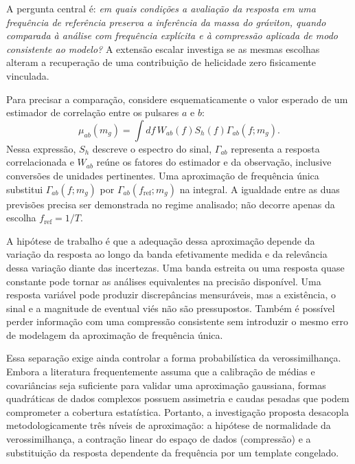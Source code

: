 A pergunta central é: \emph{em quais condições a avaliação da resposta
em uma frequência de referência preserva a inferência da massa do
gráviton, quando comparada à análise com frequência explícita e à
compressão aplicada de modo consistente ao modelo?} A extensão escalar
investiga se as mesmas escolhas alteram a recuperação de uma
contribuição de helicidade zero fisicamente vinculada.

Para precisar a comparação, considere esquematicamente o valor esperado
de um estimador de correlação entre os pulsares \(a\) e \(b\):
\begin{equation}
  \mu_{ab}(m_g)=\int df\,W_{ab}(f)S_h(f)
  \Gamma_{ab}(f;m_g).
  \label{eq:intro-compressao}
\end{equation}
Nessa expressão, \(S_h\) descreve o espectro do sinal,
\(\Gamma_{ab}\) representa a resposta correlacionada e \(W_{ab}\)
reúne os fatores do estimador e da observação, inclusive conversões de
unidades pertinentes. Uma aproximação de frequência única substitui
\(\Gamma_{ab}(f;m_g)\) por
\(\Gamma_{ab}(f_{\mathrm{ref}};m_g)\) na integral. A igualdade entre
as duas previsões precisa ser demonstrada no regime analisado; não
decorre apenas da escolha \(f_{\mathrm{ref}}=1/T\).

A hipótese de trabalho é que a adequação dessa aproximação depende da
variação da resposta ao longo da banda efetivamente medida e da
relevância dessa variação diante das incertezas. Uma banda estreita ou
uma resposta quase constante pode tornar as análises equivalentes na
precisão disponível. Uma resposta variável pode produzir discrepâncias
mensuráveis, mas a existência, o sinal e a magnitude de eventual viés
não são pressupostos. Também é possível perder informação com uma
compressão consistente sem introduzir o mesmo erro de modelagem da
aproximação de frequência única.

Essa separação exige ainda controlar a forma probabilística da verossimilhança.
Embora a literatura frequentemente assuma que a calibração de médias e covariâncias
seja suficiente para validar uma aproximação gaussiana, formas quadráticas de dados
complexos possuem assimetria e caudas pesadas que podem comprometer a cobertura
estatística. Portanto, a investigação proposta desacopla metodologicamente três
níveis de aproximação: a hipótese de normalidade da verossimilhança, a contração
linear do espaço de dados (compressão) e a substituição da resposta dependente da
frequência por um template congelado.

